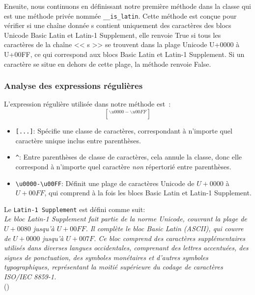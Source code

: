 \noindent
Ensuite, nous continuons en définissant notre première méthode dans la classe qui est une méthode privée nommée \texttt{\_\_is\_latin}. Cette méthode est conçue pour vérifier si une chaîne donnée s contient uniquement des caractères des blocs Unicode Basic Latin et Latin-1 Supplement, elle renvoie True si tous les caractères de la chaîne << s >> se trouvent dans la plage Unicode U+0000 à U+00FF, ce qui correspond aux blocs Basic Latin et Latin-1 Supplement. Si un caractère se situe en dehors de cette plage, la méthode renvoie False.

\subsubsection{Analyse des expressions régulières}
\noindent
L'expression régulière utilisée dans notre méthode est :
\Large\[ [^{\backslash u0000-\backslash u00FF}] \]
\begin{itemize}
	\item \texttt{[...]}: Spécifie une classe de caractères, correspondant à n'importe quel caractère unique inclus entre parenthèses.
	\item \texttt{\^{}}: Entre parenthèses de classe de caractères, cela annule la classe, donc elle correspond à n'importe quel caractère \emph{non} répertorié entre parenthèses.
	\item \texttt{\textbackslash u0000-\textbackslash u00FF}: Définit une plage de caractères Unicode de \( U+0000 \) à \( U+00FF \), qui comprend à la fois les blocs Basic Latin et Latin-1 Supplement.
\end{itemize}

\newpage
\noindent
Le \texttt{Latin-1 Supplement} est défini comme suit: \\
\textit{Le bloc Latin-1 Supplement fait partie de la norme Unicode, couvrant la plage de \( U+0080 \) jusqu'à \( U+00FF \). Il complète le bloc Basic Latin (ASCII), qui couvre de \( U+0000 \) jusqu'à \( U+007F \). Ce bloc comprend des caractères supplémentaires utilisés dans diverses langues occidentales, comprenant des lettres accentuées, des signes de ponctuation, des symboles monétaires et d'autres symboles typographiques, représentant la moitié supérieure du codage de caractères ISO/IEC 8859-1.} \\
 (\cite{symbl:latin1supp})


